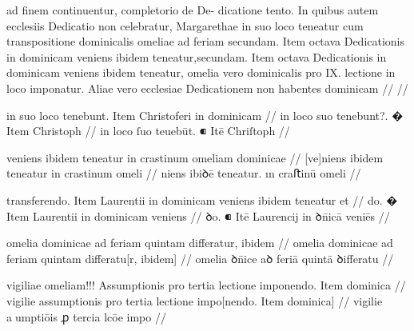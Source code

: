 \ex \bg
\gla
{}
ad finem continuentur, completorio de De-
dicatione tento.
In quibus autem ecclesiis Dedicatio non celebratur, Margarethae
in suo loco teneatur cum transpositione dominicalis omeliae ad feriam
secundam.
Item octava Dedicationis in dominicam veniens ibidem teneatur,secundam.
Item octava Dedicationis in dominicam veniens ibidem teneatur,
omelia vero dominicalis pro IX. lectione in loco imponatur. Aliae vero
ecclesiae Dedicationem non habentes dominicam
//
\glRekonstrukcja
{}
//
\endgl
\xe



\ex \bg
\gla
{}
in suo loco {} tenebunt.
{} Item Christoferi in dominicam 
//
\glRekonstrukcja
{}
in {} loco suo tenebunt?.
� Item Christoph 
//
\glU
{}
in {} loco ſuo teuebūt. ⁌ Itē Chriſtoph 
//
\endgl
\xe



\ex \bg
\gla
{}
veniens ibidem teneatur in crastinum
omeliam dominicae 
//
\glRekonstrukcja
{}
[ve]niens ibidem teneatur in crastinum
omeli
//
\glU
{}
niens ibiꝺē teneatur. ın craﬅinū omeli
//
\endgl
\xe



\ex \bg
\gla
{}
transferendo.
{} Item Laurentii in dominicam veniens ibidem teneatur et 
//
\glRekonstrukcja
{}
do.
� Item Laurentii in dominicam veniens
//
\glU
{}
ꝺo. ⁌ Itē Laurencij in ꝺn̄icā veniēs
//
\endgl
\xe



\ex \bg
\gla
{}
omelia
dominicae ad feriam quintam differatur, ibidem 
//
\glRekonstrukcja
{}
omelia
dominicae ad feriam quintam differatu[r, ibidem]
//
\glU
{}
omelia ꝺn̄ice aꝺ feriā quintā ꝺiﬀeratu
//
\endgl
\xe



\ex \bg
\gla
{}
vigiliae omeliam!!! Assumptionis pro tertia lectione imponendo. Item dominica 
//
\glRekonstrukcja
{}
vigilie {} assumptionis pro tertia lectione impo[nendo. Item dominica] 
//
\glU
{}
vigilie {} aumptiōis ꝓ tercia lcōe impo  
//
\endgl
\xe



